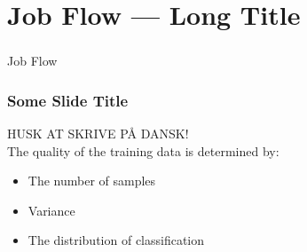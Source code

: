 \section[Job Flow]{Job Flow --- Long Title}

\begin{frame}
  \frametitle{}
  \begin{center}
    {\Huge Job Flow}
  \end{center}
\end{frame}

\begin{frame}
    \frametitle{Some Slide Title}
    HUSK AT SKRIVE PÅ DANSK!\\
    The quality of the training data is determined by:
    \begin{itemize}
        \item The number of samples
        \item Variance
        \item The distribution of classification
    \end{itemize}
\end{frame}
